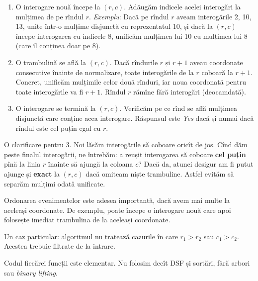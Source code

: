 \begin{enumerate}
  \item O interogare nouă începe la $(r,c)$. Adăugăm indicele acelei interogări la mulțimea de pe rîndul $r$. \textit{Exemplu}: Dacă pe rîndul $r$ aveam interogările 2, 10, 13, unite într-o mulțime disjunctă cu reprezentatul 10, și dacă la $(r,c)$ începe interogarea cu indicele 8, unificăm mulțimea lui 10 cu mulțimea lui 8 (care îl conținea doar pe 8).

  \item O trambulină se află la $(r,c)$. Dacă rîndurile $r$ și $r+1$ aveau coordonate consecutive înainte de normalizare, toate interogările de la $r$ coboară la $r+1$. Concret, unificăm mulțimile celor două rînduri, iar noua coordonată pentru toate interogările va fi $r+1$. Rîndul $r$ rămîne fără interogări (deocamdată).

  \item O interogare se termină la $(r,c)$. Verificăm pe ce rînd se află mulțimea disjunctă care conține acea interogare. Răspunsul este \textit{Yes} dacă și numai dacă rîndul este cel puțin egal cu $r$.
\end{enumerate}

O clarificare pentru 3. Noi lăsăm interogările să coboare oricît de jos. Cînd dăm peste finalul interogării, ne întrebăm: a reușit interogarea să coboare \textbf{cel puțin} pînă la linia $r$ înainte să ajungă la coloana $c$? Dacă da, atunci desigur am fi putut ajunge și \textbf{exact} la $(r,c)$ dacă omiteam niște trambuline. Astfel evităm să separăm mulțimi odată unificate.

Ordonarea evenimentelor este adesea importantă, dacă avem mai multe la aceleași coordonate. De exemplu, poate începe o interogare nouă care apoi folosește imediat trambulina de la aceleași coordonate.

Un caz particular: algoritmul nu tratează cazurile în care $r_1 > r_2$ sau $c_1 > c_2$. Acestea trebuie filtrate de la intrare.

Codul fiecărei funcții este elementar. Nu folosim decît DSF și sortări, fără arbori sau \textit{binary lifting}.
